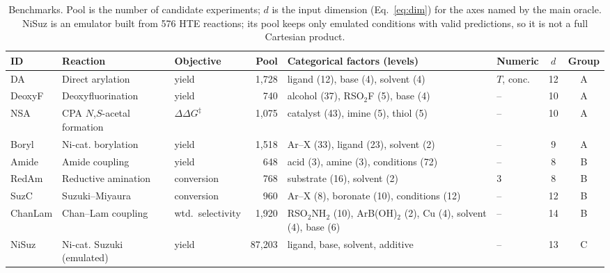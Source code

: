 \begin{table}[t]
\centering
\small
\setlength{\tabcolsep}{4pt}
\begin{tabular}{@{}l l l r p{4.3cm} l c c@{}}
\toprule
ID & Reaction & Objective & Pool & Categorical factors (levels) & Numeric & $d$ & Group \\
\midrule
DA & Direct arylation & yield & 1,728 & ligand (12), base (4), solvent (4) & $T$, conc. & 12 & A \\
DeoxyF & Deoxyfluorination & yield & 740 & alcohol (37), RSO$_2$F (5), base (4) & -- & 10 & A \\
NSA & CPA $N$,$S$-acetal formation & $\Delta\Delta G^{\ddagger}$ & 1,075 & catalyst (43), imine (5), thiol (5) & -- & 10 & A \\
Boryl & Ni-cat. borylation & yield & 1,518 & Ar--X (33), ligand (23), solvent (2) & -- & 9 & A \\
Amide & Amide coupling & yield & 648 & acid (3), amine (3), conditions (72) & -- & 8 & B \\
RedAm & Reductive amination & conversion & 768 & substrate (16), solvent (2) & 3 & 8 & B \\
SuzC & Suzuki--Miyaura & conversion & 960 & Ar--X (8), boronate (10), conditions (12) & -- & 12 & B \\
ChanLam & Chan--Lam coupling & wtd.\ selectivity & 1,920 & RSO$_2$NH$_2$ (10), ArB(OH)$_2$ (2), Cu (4), solvent (4), base (6) & -- & 14 & B \\
NiSuz & Ni-cat. Suzuki (emulated) & yield & 87,203 & ligand, base, solvent, additive & -- & 13 & C \\
\bottomrule
\end{tabular}
\caption{Benchmarks. Pool is the number of candidate experiments; $d$ is the \ours{} input dimension (Eq.~\ref{eq:dim}) for the axes named by the main oracle. NiSuz is an emulator built from 576 HTE reactions; its pool keeps only emulated conditions with valid predictions, so it is not a full Cartesian product.}
\label{tab:tasks}
\end{table}
